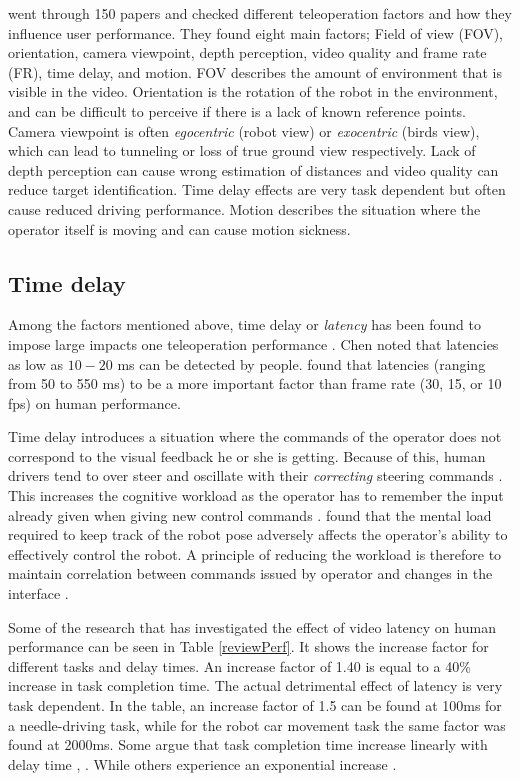\citet{Chen2007} went through 150 papers and checked different teleoperation factors and how they influence user performance. They found eight main factors; Field of view (FOV), orientation, camera viewpoint, depth perception, video quality and frame rate (FR), time delay, and motion. FOV describes the amount of environment that is visible in the video. Orientation is the rotation of the robot in the environment, and can be difficult to perceive if there is a lack of known reference points. Camera viewpoint is often \emph{egocentric} (robot view) or \emph{exocentric} (birds view), which can lead to tunneling or loss of true ground view respectively. Lack of depth perception can cause wrong estimation of distances and video quality can reduce target identification. Time delay effects are very task dependent but often cause reduced driving performance. Motion describes the situation where the operator itself is moving and can cause motion sickness.

\vspace{-3mm}
\subsection{Time delay}\label{timeDelay}
\vspace{-3mm}

Among the factors mentioned above, time delay or \emph{latency} has been found to impose large impacts one teleoperation performance \citep{Chen2007}. Chen noted that latencies as low as $10-20$ ms can be detected by people. \citet{Arthur1993} found that latencies (ranging from 50 to 550 ms) to be a more important factor than frame rate (30, 15, or 10 fps) on human performance. 

Time delay introduces a situation where the commands of the operator does not correspond to the visual feedback he or she is getting. Because of this, human drivers tend to over steer and oscillate with their \emph{correcting} steering commands \citep{Appelqvist2007}. This increases the cognitive workload as the operator has to remember the input already given when giving new control commands \citep{Matheson2013}. \citet{Ricks2004} found that the mental load required to keep track of the robot pose adversely affects the operator's ability to effectively control the robot. A principle of reducing the workload is therefore to maintain correlation between commands issued by operator and changes in the interface \citep{Nielsen2007}. 

Some of the research that has investigated the effect of video latency on human performance can be seen in Table \ref{reviewPerf}. It shows the increase factor for different tasks and delay times. An increase factor of 1.40 is equal to a 40\% increase in task completion time. The actual detrimental effect of latency is very task dependent. In the table, an increase factor of 1.5 can be found at 100ms for a needle-driving task, while for the robot car movement task  the same factor was found at 2000ms. Some argue that task completion time increase linearly with delay time \citep{Ando1999}, \citep{Lane2002}. While others experience an exponential increase \citep{Xu2014}.



